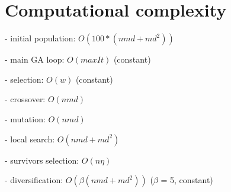 \section{Computational complexity}

- initial population: $O(100 * (nmd + md^2))$

- main GA loop: $O(maxIt)$ (constant)

- selection: $O(w)$ (constant)

- crossover: $O(nmd)$

- mutation: $O(nmd)$

- local search: $O(nmd + md^2)$

- survivors selection: $O(n\eta)$

- diversification: $O(\beta (nmd + md^2))$ ($\beta$ = 5, constant)